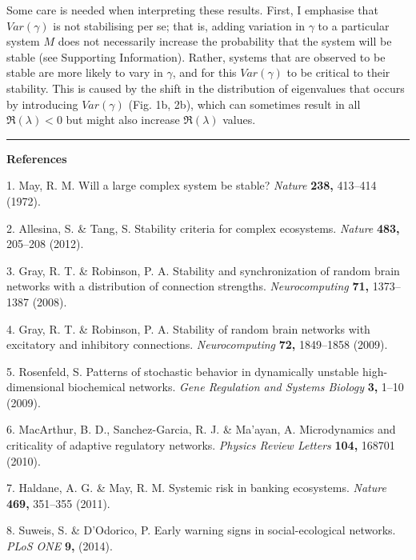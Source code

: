 \documentclass[]{article}
\begin{document}
Some care is needed when interpreting these results. First, I emphasise
that \(Var(\gamma)\) is not stabilising per se; that is, adding
variation in \(\gamma\) to a particular system \(M\) does not
necessarily increase the probability that the system will be stable (see
Supporting Information). Rather, systems that are observed to be stable
are more likely to vary in \(\gamma\), and for this \(Var(\gamma)\) to
be critical to their stability. This is caused by the shift in the
distribution of eigenvalues that occurs by introducing \(Var(\gamma)\)
(Fig. 1b, 2b), which can sometimes result in all \(\Re(\lambda) < 0\)
but might also increase \(\Re(\lambda)\) values.

\begin{center}\rule{0.5\linewidth}{\linethickness}\end{center}

\textbf{References}

\hypertarget{refs}{}
\hypertarget{ref-May1972}{}
1. May, R. M. Will a large complex system be stable? \emph{Nature}
\textbf{238,} 413--414 (1972).

\hypertarget{ref-Allesina2012}{}
2. Allesina, S. \& Tang, S. Stability criteria for complex ecosystems.
\emph{Nature} \textbf{483,} 205--208 (2012).

\hypertarget{ref-Gray2008}{}
3. Gray, R. T. \& Robinson, P. A. Stability and synchronization of
random brain networks with a distribution of connection strengths.
\emph{Neurocomputing} \textbf{71,} 1373--1387 (2008).

\hypertarget{ref-Gray2009}{}
4. Gray, R. T. \& Robinson, P. A. Stability of random brain networks
with excitatory and inhibitory connections. \emph{Neurocomputing}
\textbf{72,} 1849--1858 (2009).

\hypertarget{ref-Rosenfeld2009}{}
5. Rosenfeld, S. Patterns of stochastic behavior in dynamically unstable
high-dimensional biochemical networks. \emph{Gene Regulation and Systems
Biology} \textbf{3,} 1--10 (2009).

\hypertarget{ref-MacArthur2010}{}
6. MacArthur, B. D., Sanchez-Garcia, R. J. \& Ma'ayan, A. Microdynamics
and criticality of adaptive regulatory networks. \emph{Physics Review
Letters} \textbf{104,} 168701 (2010).

\hypertarget{ref-Haldane2011}{}
7. Haldane, A. G. \& May, R. M. Systemic risk in banking ecosystems.
\emph{Nature} \textbf{469,} 351--355 (2011).

\hypertarget{ref-Suweis2014}{}
8. Suweis, S. \& D'Odorico, P. Early warning signs in social-ecological
networks. \emph{PLoS ONE} \textbf{9,} (2014).
\end{document}

